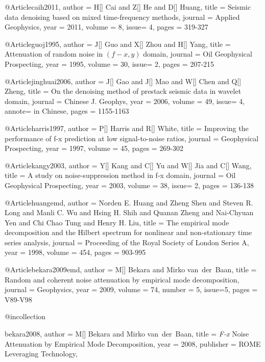 @Article{caih2011,
  author = 	 {H[] Cai and Z[] He and D[] Huang},
  title = 	 {Seismic data denoising based on mixed time-frequency methods},
  journal = 	 {Applied Geophysics},
  year = 	 2011,
  volume =	 8,
  issue= 	 4,
  pages =	 {319-327}
}

@Article{guoj1995,
  author = 	 {J[] Guo and X[] Zhou and H[] Yang},
  title = 	 {Attenuation of random noise in $(f-x,y)$ domain},
  journal = 	 {Oil Geophysical Prospecting},
  year = 	 1995,
  volume =	 30,
  issue=        2,
  pages =	 {207-215}
}

@Article{jinghuai2006,
  author = 	 {J[] Gao and J[] Mao and W[] Chen and Q[] Zheng},
  title = 	 {On the denoising method of prestack seismic data in wavelet domain},
  journal = 	 {Chinese J. Geophys},
  year = 	 2006,
  volume =	 49,
  issue= 	 4,
  annote=        {in Chinese},
  pages =	 {1155-1163}
}

@Article{harris1997,
  author = 	 {P[] Harris and R[] White},
  title = 	 {Improving the performance of f-x prediction at low signal-to-noise ratios},
  journal = 	 {Geophysical Prospecting},
  year = 	 1997,
  volume =	 45,
  pages =	 {269-302}
}


@Article{kangy2003,
  author = 	 {Y[] Kang and C[] Yu and W[] Jia and C[] Wang},
  title = 	 {A study on noise-suppression method in f-x domain},
  journal = 	 {Oil Geophysical Prospecting},
  year = 	 2003,
  volume =	 38,
  issue=        2,
  pages =	 {136-138}
}

@Article{huangemd,
  author = 	 {Norden E. Huang and Zheng Shen and Steven R. Long and Manli C. Wu and Hsing H. Shih and Quanan Zheng and Nai-Chyuan Yen and Chi Chao Tung and Henry H. Liu},
  title = 	 {The empirical mode decomposition and the {Hilbert} spectrum for nonlinear and non-stationary time series analysis},
  journal = 	 {Proceeding of the Royal Society of London Series A},
  year = 	 1998,
  volume = 	 454,
  pages = 	 {903-995}}

@Article{bekara2009emd,
  author = 	 {M[] Bekara and Mirko van~der~Baan},
  title = 	 {Random and coherent noise attenuation by empirical mode decomposition},
  journal = 	 {Geophysics},
  year = 	 2009,
  volume = 	 74,
  number = 	 5,
  issue=5,
  pages = 	 {V89-V98}}

@incollection{bekara2008,
author = {M[] Bekara and Mirko van~der~Baan},
title = { \emph{F-x} Noise Attenuation by Empirical Mode Decomposition},
year = {2008},
publisher = {ROME Leveraging Technology},

}

